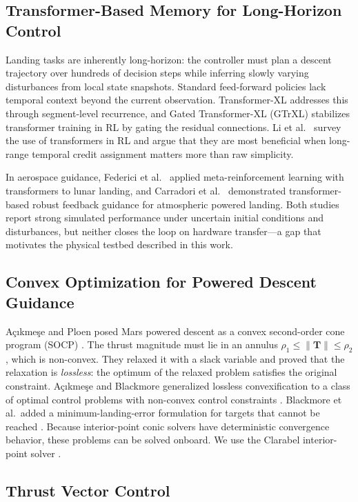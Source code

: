\documentclass[conference]{IEEEtran}
\begin{document}
\subsection{Transformer-Based Memory for Long-Horizon Control}

Landing tasks are inherently long-horizon: the controller must plan a descent trajectory over hundreds of decision steps while inferring slowly varying disturbances from local state snapshots. Standard feed-forward policies lack temporal context beyond the current observation. Transformer-XL \cite{b17} addresses this through segment-level recurrence, and Gated Transformer-XL (GTrXL) \cite{b16} stabilizes transformer training in RL by gating the residual connections. Li et al.\ \cite{b18} survey the use of transformers in RL and argue that they are most beneficial when long-range temporal credit assignment matters more than raw simplicity.

In aerospace guidance, Federici et al.\ \cite{b19} applied meta-reinforcement learning with transformers to lunar landing, and Carradori et al.\ \cite{b20} demonstrated transformer-based robust feedback guidance for atmospheric powered landing. Both studies report strong simulated performance under uncertain initial conditions and disturbances, but neither closes the loop on hardware transfer---a gap that motivates the physical testbed described in this work.

\subsection{Convex Optimization for Powered Descent Guidance}

A\c{c}{\i}kme\c{s}e and Ploen posed Mars powered descent as a convex second-order cone program (SOCP) \cite{b21}. The thrust magnitude must lie in an annulus $\rho_1 \le \|\mathbf{T}\| \le \rho_2$, which is non-convex. They relaxed it with a slack variable and proved that the relaxation is \emph{lossless}: the optimum of the relaxed problem satisfies the original constraint. A\c{c}{\i}kme\c{s}e and Blackmore generalized lossless convexification to a class of optimal control problems with non-convex control constraints \cite{b22}. Blackmore et al.\ added a minimum-landing-error formulation for targets that cannot be reached \cite{b23}. Because interior-point conic solvers have deterministic convergence behavior, these problems can be solved onboard. We use the Clarabel interior-point solver \cite{b24}.

\subsection{Thrust Vector Control}
\end{document}
